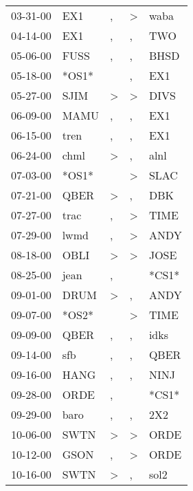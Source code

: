 \begin{supertabular}{lllll}
 03-31-00 &    EX1 &                , &     \textgreater &   waba \\
 04-14-00 &    EX1 &                , &                , &    TWO \\
 05-06-00 &   FUSS &                , &                , &   BHSD \\
 05-18-00 &  *OS1* &                  &                , &    EX1 \\
 05-27-00 &   SJIM &     \textgreater &     \textgreater &   DIVS \\
 06-09-00 &   MAMU &                , &                , &    EX1 \\
 06-15-00 &   tren &                , &                , &    EX1 \\
 06-24-00 &   chml &     \textgreater &                , &   alnl \\
 07-03-00 &  *OS1* &                  &     \textgreater &   SLAC \\
 07-21-00 &   QBER &     \textgreater &                , &    DBK \\
 07-27-00 &   trac &                , &     \textgreater &   TIME \\
 07-29-00 &   lwmd &                , &     \textgreater &   ANDY \\
 08-18-00 &   OBLI &     \textgreater &     \textgreater &   JOSE \\
 08-25-00 &   jean &                , &                  &  *CS1* \\
 09-01-00 &   DRUM &     \textgreater &                , &   ANDY \\
 09-07-00 &  *OS2* &                  &     \textgreater &   TIME \\
 09-09-00 &   QBER &                , &                , &   idks \\
 09-14-00 &    sfb &                , &                , &   QBER \\
 09-16-00 &   HANG &                , &                , &   NINJ \\
 09-28-00 &   ORDE &                , &                  &  *CS1* \\
 09-29-00 &   baro &                , &                , &    2X2 \\
 10-06-00 &   SWTN &     \textgreater &     \textgreater &   ORDE \\
 10-12-00 &   GSON &                , &     \textgreater &   ORDE \\
 10-16-00 &   SWTN &     \textgreater &                , &   sol2 \\

\end{supertabular}
